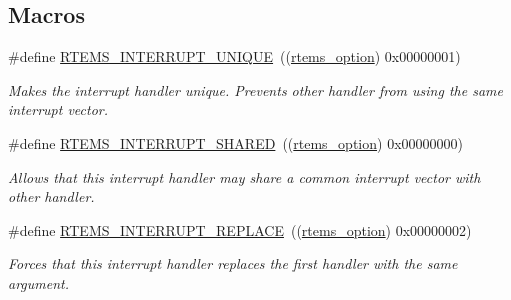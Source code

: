 \subsection*{Macros}
\begin{DoxyCompactItemize}
\item 
\mbox{\label{group__rtems__interrupt__extension_ga5f61e9433b266894801af5ed9992efac}} 
\#define \mbox{\hyperlink{group__rtems__interrupt__extension_ga5f61e9433b266894801af5ed9992efac}{R\+T\+E\+M\+S\+\_\+\+I\+N\+T\+E\+R\+R\+U\+P\+T\+\_\+\+U\+N\+I\+Q\+UE}}~((\mbox{\hyperlink{group__ClassicOptions_gad26685eb0e60a9650082935c31920e29}{rtems\+\_\+option}}) 0x00000001)
\begin{DoxyCompactList}\small\item\em Makes the interrupt handler unique. Prevents other handler from using the same interrupt vector. \end{DoxyCompactList}\item 
\mbox{\label{group__rtems__interrupt__extension_ga4ef5d96798d52439c7836596650f7d98}} 
\#define \mbox{\hyperlink{group__rtems__interrupt__extension_ga4ef5d96798d52439c7836596650f7d98}{R\+T\+E\+M\+S\+\_\+\+I\+N\+T\+E\+R\+R\+U\+P\+T\+\_\+\+S\+H\+A\+R\+ED}}~((\mbox{\hyperlink{group__ClassicOptions_gad26685eb0e60a9650082935c31920e29}{rtems\+\_\+option}}) 0x00000000)
\begin{DoxyCompactList}\small\item\em Allows that this interrupt handler may share a common interrupt vector with other handler. \end{DoxyCompactList}\item 
\mbox{\label{group__rtems__interrupt__extension_gaca2eb7f8caa5eda72bd6924ee4c8e5d3}} 
\#define \mbox{\hyperlink{group__rtems__interrupt__extension_gaca2eb7f8caa5eda72bd6924ee4c8e5d3}{R\+T\+E\+M\+S\+\_\+\+I\+N\+T\+E\+R\+R\+U\+P\+T\+\_\+\+R\+E\+P\+L\+A\+CE}}~((\mbox{\hyperlink{group__ClassicOptions_gad26685eb0e60a9650082935c31920e29}{rtems\+\_\+option}}) 0x00000002)
\begin{DoxyCompactList}\small\item\em Forces that this interrupt handler replaces the first handler with the same argument. \end{DoxyCompactList}\item 
\mbox{\label{group__rtems__interrupt__extension_ga2058eb9a90d813aced09c21a4ce61829}} 

\end{DoxyCompactItemize}
